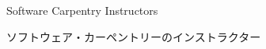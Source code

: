 \documentclass{beamer}
\begin{document}
 \begin{frame}
 
 \begin{center}
      
       Software Carpentry Instructors \\ \begin{CJK}{UTF8}{min}ソフトウェア・カーペントリーのインストラクター\end{CJK}
  \end{center}
 
\end{frame}  

  \begin{frame}

\begin{center}
  \end{center}

\end{frame}
\fi
\end{document}
